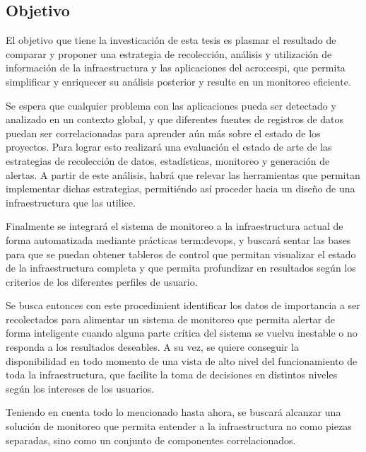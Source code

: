 \subsection{Objetivo}
\label{objetivo}

El objetivo que tiene la investicación de esta tesis es plasmar el resultado de
comparar y proponer una estrategia de recolección, análisis y utilización de
información de la infraestructura y las aplicaciones del \gls{acro:cespi}, que
permita simplificar y enriquecer su análisis posterior y resulte en un
monitoreo eficiente.

Se espera que cualquier problema con las aplicaciones pueda ser detectado y
analizado en un contexto global, y que diferentes fuentes de registros de datos
puedan ser correlacionadas para aprender aún más sobre el estado de los
proyectos. Para lograr esto realizará una evaluación el estado de arte de las
estrategias de recolección de datos, estadísticas, monitoreo y generación de
alertas.  A partir de este análisis, habrá que relevar las herramientas que
permitan implementar dichas estrategias, permitiéndo así proceder hacia un
diseño de una infraestructura que las utilice.

Finalmente se integrará el sistema de monitoreo a la infraestructura actual de
forma automatizada mediante prácticas \gls{term:devops}, y buscará sentar las
bases para que se puedan obtener tableros de control que permitan visualizar el
estado de la infraestructura completa y que permita profundizar en resultados
según los criterios de los diferentes perfiles de usuario.

Se busca entonces con este procedimient identificar los datos de importancia a
ser recolectados para alimentar un sistema de monitoreo que permita alertar de
forma inteligente cuando alguna parte crítica del sistema se vuelva inestable o
no responda a los resultados deseables. A su vez, se quiere conseguir la
disponibilidad en todo momento de una vista de alto nivel del funcionamiento de
toda la infraestructura, que facilite la toma de decisiones en distintos
niveles según los intereses de los usuarios.

Teniendo en cuenta todo lo mencionado hasta ahora, se buscará alcanzar una
solución de monitoreo que permita entender a la infraestructura no como piezas
separadas, sino como un conjunto de componentes correlacionados.
